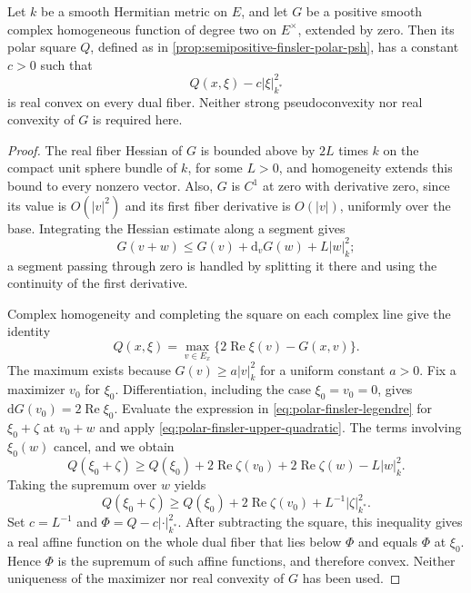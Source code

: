 \begin{lemma}\label{lem:polar-finsler-uniform-strong-convexity}
Let $k$ be a smooth Hermitian metric on $E$, and let $G$ be a positive smooth complex homogeneous function of degree two on $E^\times$, extended by zero. Then its polar square $Q$, defined as in \cref{prop:semipositive-finsler-polar-psh}, has a constant $c>0$ such that
\[
 Q(x,\xi)-c|\xi|_{k^*}^2
\]
is real convex on every dual fiber. Neither strong pseudoconvexity nor real convexity of $G$ is required here.
\end{lemma}
\begin{proof}
The real fiber Hessian of $G$ is bounded above by $2L$ times $k$ on the compact unit sphere bundle of $k$, for some $L>0$, and homogeneity extends this bound to every nonzero vector. Also, $G$ is $C^1$ at zero with derivative zero, since its value is $O(|v|^2)$ and its first fiber derivative is $O(|v|)$, uniformly over the base. Integrating the Hessian estimate along a segment gives
\begin{equation}\label{eq:polar-finsler-upper-quadratic}
 G(v+w)\leq G(v)+\mathrm d_vG(w)+L|w|_k^2;
\end{equation}
a segment passing through zero is handled by splitting it there and using the continuity of the first derivative.

Complex homogeneity and completing the square on each complex line give the identity
\begin{equation}\label{eq:polar-finsler-legendre}
 Q(x,\xi)=\max_{v\in E_x}
                  \{2\operatorname{Re}\xi(v)-G(x,v)\}.
\end{equation}
The maximum exists because $G(v)\geq a|v|_k^2$ for a uniform constant $a>0$. Fix a maximizer $v_0$ for $\xi_0$. Differentiation, including the case $\xi_0=v_0=0$, gives $\mathrm dG(v_0)=2\operatorname{Re}\xi_0$. Evaluate the expression in \eqref{eq:polar-finsler-legendre} for $\xi_0+\zeta$ at $v_0+w$ and apply \eqref{eq:polar-finsler-upper-quadratic}. The terms involving $\xi_0(w)$ cancel, and we obtain
\[
 Q(\xi_0+\zeta)\geq Q(\xi_0)+2\operatorname{Re}\zeta(v_0)
                 +2\operatorname{Re}\zeta(w)-L|w|_k^2.
\]
Taking the supremum over $w$ yields
\[
 Q(\xi_0+\zeta)\geq Q(\xi_0)+2\operatorname{Re}\zeta(v_0)
                         +L^{-1}|\zeta|_{k^*}^2.
\]
Set $c=L^{-1}$ and $\Phi=Q-c|\cdot|_{k^*}^2$. After subtracting the square, this inequality gives a real affine function on the whole dual fiber that lies below $\Phi$ and equals $\Phi$ at $\xi_0$. Hence $\Phi$ is the supremum of such affine functions, and therefore convex. Neither uniqueness of the maximizer nor real convexity of $G$ has been used.
\end{proof}

